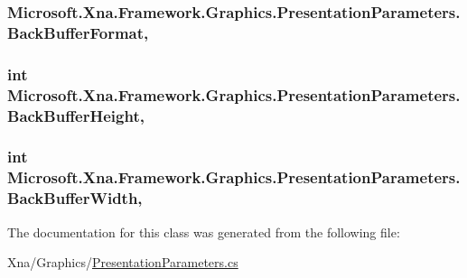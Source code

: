 \subsubsection[{Back\+Buffer\+Format}]{ Microsoft.\+Xna.\+Framework.\+Graphics.\+Presentation\+Parameters.\+Back\+Buffer\+Format\hspace{0.3cm}{\ttfamily [get]}, {\ttfamily [set]}}\label{class_microsoft_1_1_xna_1_1_framework_1_1_graphics_1_1_presentation_parameters_a903f3dd668360132979a05dd32cd92a7}
\hypertarget{class_microsoft_1_1_xna_1_1_framework_1_1_graphics_1_1_presentation_parameters_ad687e79e9da6258abf9b2ebcf380ccbc}{}
\subsubsection[{Back\+Buffer\+Height}]{\setlength{\rightskip}{0pt plus 5cm}int Microsoft.\+Xna.\+Framework.\+Graphics.\+Presentation\+Parameters.\+Back\+Buffer\+Height\hspace{0.3cm}{\ttfamily [get]}, {\ttfamily [set]}}\label{class_microsoft_1_1_xna_1_1_framework_1_1_graphics_1_1_presentation_parameters_ad687e79e9da6258abf9b2ebcf380ccbc}
\hypertarget{class_microsoft_1_1_xna_1_1_framework_1_1_graphics_1_1_presentation_parameters_ae1c122e4ab5bb54401c5391be158b01b}{}
\subsubsection[{Back\+Buffer\+Width}]{\setlength{\rightskip}{0pt plus 5cm}int Microsoft.\+Xna.\+Framework.\+Graphics.\+Presentation\+Parameters.\+Back\+Buffer\+Width\hspace{0.3cm}{\ttfamily [get]}, {\ttfamily [set]}}\label{class_microsoft_1_1_xna_1_1_framework_1_1_graphics_1_1_presentation_parameters_ae1c122e4ab5bb54401c5391be158b01b}


The documentation for this class was generated from the following file\+:\begin{DoxyCompactItemize}
\item 
Xna/\+Graphics/\hyperlink{_presentation_parameters_8cs}{Presentation\+Parameters.\+cs}\end{DoxyCompactItemize}

